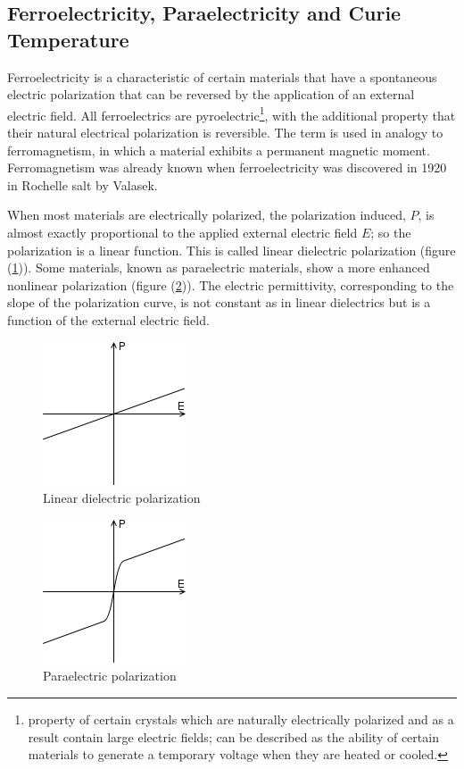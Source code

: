 \documentclass[%
 aip,
 amsmath,amssymb,
 reprint, floatfix%
]{revtex4-1}
\begin{document}
    \subsection{Ferroelectricity, Paraelectricity and Curie Temperature}
    Ferroelectricity is a characteristic of certain materials that have a spontaneous electric polarization that can be reversed by the application of an external electric field. All ferroelectrics are pyroelectric\footnote{property of certain crystals which are naturally electrically polarized and as a result contain large electric fields; can be described as the ability of certain materials to generate a temporary voltage when they are heated or cooled.}, with the additional property that their natural electrical polarization is reversible. The term is used in analogy to ferromagnetism, in which a material exhibits a permanent magnetic moment. Ferromagnetism was already known when ferroelectricity was discovered in 1920 in Rochelle salt by Valasek.
    \par
    When most materials are electrically polarized, the polarization induced, $P$, is almost exactly proportional to the applied external electric field $E$; so the polarization is a linear function. This is called linear dielectric polarization (figure (\ref{fig:linearpolar})). Some materials, known as paraelectric materials, show a more enhanced nonlinear polarization (figure (\ref{fig:para})). The electric permittivity, corresponding to the slope of the polarization curve, is not constant as in linear dielectrics but is a function of the external electric field.
    \begin{figure}
        \centering
        \includegraphics{Figures/lindielectric.png}
        \caption{Linear dielectric polarization}
        \label{fig:linearpolar}
    \end{figure}
    \begin{figure}
        \centering
        \includegraphics{Figures/160px-Paraelectric_polarisation.svg.png}
        \caption{Paraelectric polarization}
        \label{fig:para}
    \end{figure}
\end{document}
